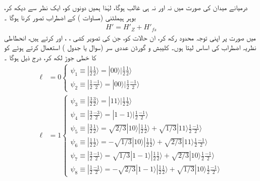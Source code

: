 درمیانے میدان کی صورت میں  نہ   اور نہ ہی  غالب ہوگا،  لہٰذا  ہمیں دونوں کو،  ایک نظر سے دیکھ کر،  بوہر ہیملٹنی (مساوات ) کے اضطراب تصور کرنا ہوگا ۔
\begin{align}
H' = H'_Z + H'_{fs}
\end{align}
میں  صورت پر اپنی توجہ محدود رکھ کر،  ان  حالات کو، جن کی تصویر کشی  ، ، اور   کرتے ہیں،    انحطاطی نظریہ اضطراب کی  اساس لیتا ہوں۔  کلیبش و  گورڈن عددی سر (سوال  یا جدول  )  استعمال کرتے   ہوئے  کو 
 کا خطی جوڑ لکھ کر،  درج ذیل ہوگا ۔
\begin{align*}
\ell &= 0
\begin{cases}
\psi_1 \equiv | \frac{1}{2} \frac{1}{2} \rangle = | 00 \rangle | \frac{1}{2} \frac{1}{2} \rangle \\
\psi_2 \equiv | \frac{1}{2} \frac{-1}{2} \rangle = | 00 \rangle | \frac{1}{2} \frac{-1}{2} \rangle
\end{cases} \\
\ell  &= 1
\begin{cases}
\psi_3 \equiv | \frac{3}{2} \frac{3}{2} \rangle = | 11 \rangle | \frac{1}{2} \frac{1}{2} \rangle \\
\psi_4 \equiv | \frac{3}{2} \frac{-3}{2} \rangle = | 1 - 1 \rangle | \frac{1}{2} \frac{-1}{2} \rangle \\
\psi_5 \equiv | \frac{3}{2} \frac{1}{2} \rangle = \sqrt{2/3}| 10 \rangle | \frac{1}{2} \frac{1}{2} \rangle + \sqrt{1/3} | 11 \rangle \frac{1}{2} \frac{-1}{2} \rangle \\
\psi_6 \equiv | \frac{1}{2} \frac{1}{2} \rangle = - \sqrt{1/3} | 10 \rangle | \frac{1}{2} \frac{1}{2} \rangle + \sqrt{2/3} | 11 \rangle \frac{1}{2} \frac{-1}{2} \rangle \\
\psi_7 \equiv | \frac{3}{2} \frac{-1}{2} \rangle = \sqrt{1/3} | 1 - 1 \rangle | \frac{1}{2} \frac{1}{2} \rangle + \sqrt{2/3} | 10 \rangle \frac{1}{2} \frac{-1}{2} \rangle \\
\psi_8 \equiv | \frac{1}{2} \frac{-1}{2} \rangle = - \sqrt{2/3} | 1 - 1 \rangle | \frac{1}{2} \frac{1}{2} \rangle + \sqrt{1/3} | 10 \rangle \frac{1}{2} \frac{-1}{2} \rangle
\end{cases}
\end{align*}

